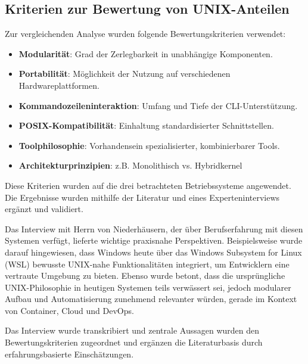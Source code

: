 

\subsection{Kriterien zur Bewertung von UNIX-Anteilen}

Zur vergleichenden Analyse wurden folgende Bewertungskriterien verwendet:

\begin{itemize}
	\setlength{\itemsep}{0pt}
	\item \textbf{Modularität}: Grad der Zerlegbarkeit in unabhängige Komponenten.
	\item \textbf{Portabilität}: Möglichkeit der Nutzung auf verschiedenen Hardwareplattformen.
	\item \textbf{Kommandozeileninteraktion}: Umfang und Tiefe der CLI-Unterstützung.
	\item \textbf{POSIX-Kompatibilität}: Einhaltung standardisierter Schnittstellen.
	\item \textbf{Toolphilosophie}: Vorhandensein spezialisierter, kombinierbarer Tools.
	\item \textbf{Architekturprinzipien}: z.B. Monolithisch vs. Hybridkernel
\end{itemize}

Diese Kriterien wurden auf die drei betrachteten Betriebssysteme angewendet. Die Ergebnisse wurden mithilfe der Literatur und eines Experteninterviews ergänzt und
validiert.

Das Interview mit Herrn von Niederhäusern, der über Berufserfahrung mit diesen Systemen verfügt, lieferte wichtige praxisnahe Perspektiven. Beispielsweise wurde
darauf hingewiesen, dass Windows heute über das Windows Subsystem for Linux (WSL) bewusste UNIX-nahe Funktionalitäten integriert, um Entwicklern eine vertraute
Umgebung zu bieten. Ebenso wurde betont, dass die ursprüngliche UNIX-Philosophie in heutigen Systemen teils verwässert sei, jedoch modularer Aufbau und
Automatisierung zunehmend relevanter würden, gerade im Kontext von Container, Cloud und DevOps. \cite{interviewNH}

Das Interview wurde transkribiert und zentrale Aussagen wurden den Bewertungskriterien zugeordnet und ergänzen die Literaturbasis durch erfahrungsbasierte
Einschätzungen.